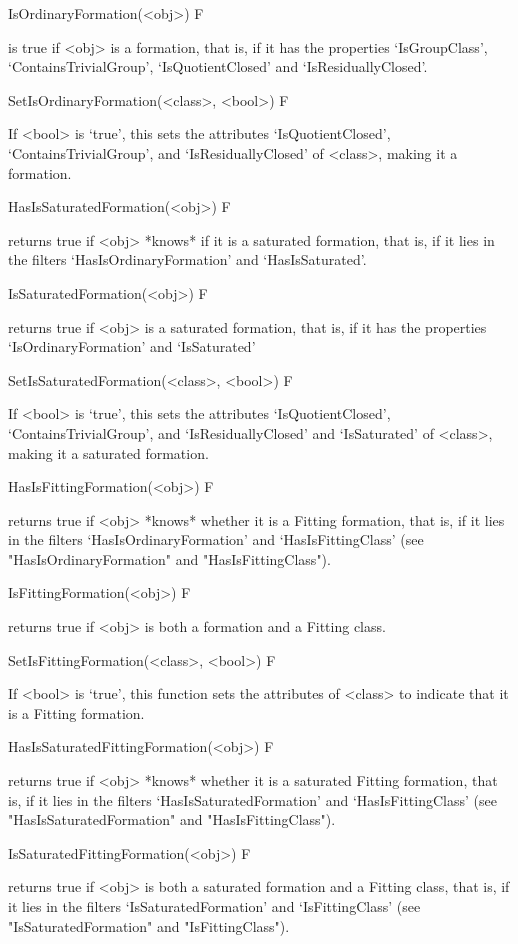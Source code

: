\>IsOrdinaryFormation(<obj>) F

%
is true if <obj> is a formation, that is, if it has the properties
`IsGroupClass', `ContainsTrivialGroup', `IsQuotientClosed' and `IsResiduallyClosed'.

\>SetIsOrdinaryFormation(<class>, <bool>) F

%
If <bool> is `true', this sets the attributes `IsQuotientClosed',
`ContainsTrivialGroup', and `IsResiduallyClosed' of <class>, making it a formation.

\>HasIsSaturatedFormation(<obj>) F

returns true if <obj> *knows* if it is a saturated formation, that is, if it
lies in the filters `HasIsOrdinaryFormation' and `HasIsSaturated'.

\>IsSaturatedFormation(<obj>) F

returns true if <obj> is a saturated formation, that is, if it has the
properties `IsOrdinaryFormation' and `IsSaturated'

\>SetIsSaturatedFormation(<class>, <bool>) F

If <bool> is `true', this sets the attributes `IsQuotientClosed',
`ContainsTrivialGroup', and `IsResiduallyClosed' and `IsSaturated'
of <class>, making it a saturated formation.

\>HasIsFittingFormation(<obj>) F

returns true if <obj> *knows* whether it is a Fitting formation, that is, if it lies in the
filters `HasIsOrdinaryFormation' and  `HasIsFittingClass' (see "HasIsOrdinaryFormation" and
"HasIsFittingClass").


\>IsFittingFormation(<obj>) F

returns true if <obj> is both a formation and a Fitting class.

\>SetIsFittingFormation(<class>, <bool>) F

If <bool> is `true', this function sets the attributes of <class> to indicate
that it is a Fitting formation.

\>HasIsSaturatedFittingFormation(<obj>)  F

returns true if <obj>  *knows* whether it is a saturated Fitting formation, that is, if it lies
in the filters `HasIsSaturatedFormation' and  `HasIsFittingClass' (see "HasIsSaturatedFormation"
and "HasIsFittingClass").

\>IsSaturatedFittingFormation(<obj>) F

returns true if <obj> is both a saturated formation and a Fitting class, that is, if it lies 
in the filters `IsSaturatedFormation' and  `IsFittingClass' (see "IsSaturatedFormation"
and "IsFittingClass").

